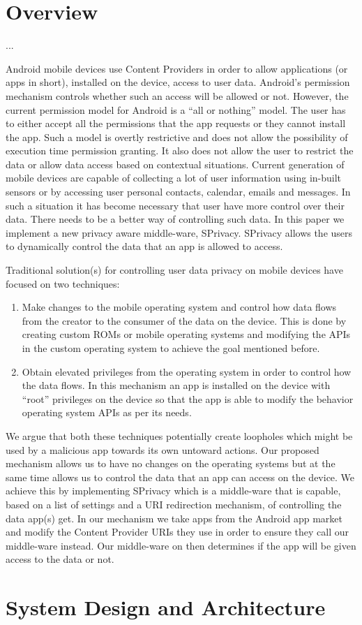 \section{Overview}
...

Android mobile devices use Content Providers in order to allow applications (or apps in short), installed on the device, access to user data. Android's permission mechanism controls whether such an access will be allowed or not. However, the current permission model for Android is a ``all or nothing'' model. The user has to either accept all the permissions that the app requests or they cannot install the app. Such a model is overtly restrictive and does not allow the possibility of execution time permission granting. It also does not allow the user to restrict the data or allow data access based on contextual situations. Current generation of mobile devices are capable of collecting a lot of user information using in-built sensors or by accessing user personal contacts, calendar, emails and messages. In such a situation it has become necessary that user have more control over their data. There needs to be a better way of controlling such data. In this paper we implement a new privacy aware middle-ware, SPrivacy. SPrivacy allows the users to dynamically control the data that an app is allowed to access. 

Traditional solution(s) for controlling user data privacy on mobile devices have focused on two techniques:
\begin{enumerate}
	\item Make changes to the mobile operating system and control how data flows from the creator to the consumer of the data on the device. This is done by creating custom ROMs or mobile operating systems and modifying the APIs in the custom operating system to achieve the goal mentioned before.
	\item Obtain elevated privileges from the operating system in order to control how the data flows. In this mechanism an app is installed on the device with ``root'' privileges on the device so that the app is able to modify the behavior operating system APIs as per its needs.
\end{enumerate}

We argue that both these techniques potentially create loopholes which might be used by a malicious app towards its own untoward actions. Our proposed mechanism allows us to have no changes on the operating systems but at the same time allows us to control the data that an app can access on the device. We achieve this by implementing SPrivacy which is a middle-ware that is capable, based on a list of settings and a URI redirection mechanism, of controlling the data app(s) get. In our mechanism we take apps from the Android app market and modify the Content Provider URIs they use in order to ensure they call our middle-ware instead. Our middle-ware on then determines if the app will be given access to the data or not.

\section{System Design and Architecture}